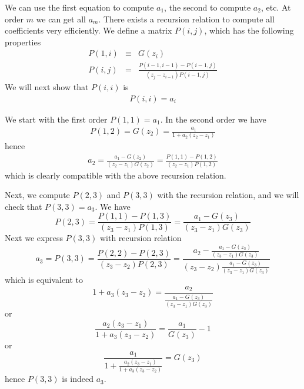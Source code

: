 \documentclass[twocolumn,prl,preprintnumbers,amsmath,amssymb,floatfix]{revtex4}
\begin{document}
\begin{widetext}
We can use the first equation to compute $a_1$, the second to compute
$a_2$, etc. At order $m$ we can get all $a_m$. There exists a
recursion relation to compute all coefficients very efficiently. We
define a matrix $P(i,j)$, which has the following properties
\begin{eqnarray}
P(1,i) &\equiv& G(z_i)\\
P(i,j) &=& \frac{P(i-1,i-1)-P(i-1,j)}{(z_j-z_{i-1})P(i-1,j)}
\end{eqnarray}
We will next show that $P(i,i)$ is
\begin{eqnarray}
P(i,i)  = a_i
\end{eqnarray}

We start with the first order $P(1,1) = a_1$. In the second order we have
\begin{eqnarray}
P(1,2) = G(z_2) = \frac{a_1}{1+a_2(z_2-z_1)}
\end{eqnarray}
hence
\begin{eqnarray}
a_2 = \frac{a_1-G(z_2)}{(z_2-z_1)G(z_2)} = \frac{P(1,1)-P(1,2)}{(z_2-z_1)P(1,2)}
\end{eqnarray}
which is clearly compatible with the above recursion relation.

Next, we compute $P(2,3)$ and $P(3,3)$ with the recursion relation,
and we will check that $P(3,3)=a_3$. We have
\begin{equation}
P(2,3) = \frac{P(1,1)-P(1,3)}{(z_3-z_1)P(1,3)}=\frac{a_1-G(z_3)}{(z_3-z_1)G(z_3)}  
\end{equation}
Next we express $P(3,3)$ with recursion relation
\begin{equation}
a_3 = P(3,3)= \frac{P(2,2)-P(2,3)}{(z_3-z_2)P(2,3)}=\frac{a_2-\frac{a_1-G(z_3)}{(z_3-z_1)G(z_3)} }{(z_3-z_2)\frac{a_1-G(z_3)}{(z_3-z_1)G(z_3)} }
\end{equation}
which is equivalent to
\begin{equation}
1+a_3(z_3-z_2) = \frac{a_2}{\frac{a_1-G(z_3)}{(z_3-z_1)G(z_3)} }
\end{equation}
or
\begin{equation}
\frac{a_2(z_3-z_1)}{1+a_3(z_3-z_2)} = \frac{a_1}{G(z_3)}-1 
\end{equation}
or
\begin{equation}
\frac{a_1}{1+\frac{a_2(z_3-z_1)}{1+a_3(z_3-z_2)}} = G(z_3)
\end{equation}
hence $P(3,3)$ is indeed $a_3$.

\end{widetext}
\end{document}
